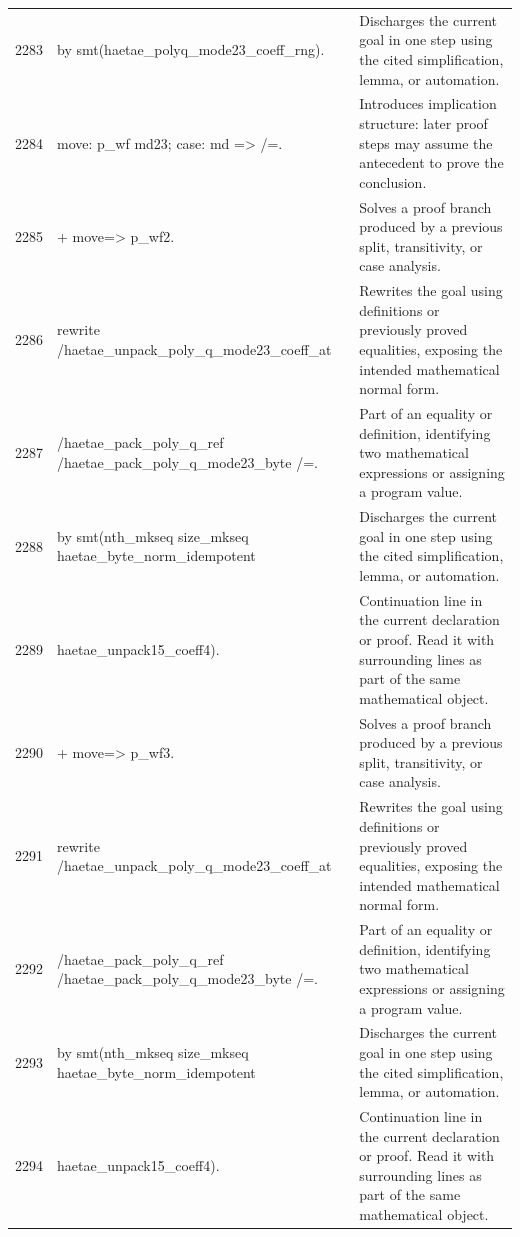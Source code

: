 \documentclass[10pt]{article}
\begin{document}
\begin{longtable}{r L{0.53\textwidth} L{0.37\textwidth}}
2283 & {\ttfamily\scriptsize   by smt(haetae\_polyq\_mode23\_coeff\_rng).} & Discharges the current goal in one step using the cited simplification, lemma, or automation. \\
2284 & {\ttfamily\scriptsize move: p\_wf md23; case: md => /=.} & Introduces implication structure: later proof steps may assume the antecedent to prove the conclusion. \\
2285 & {\ttfamily\scriptsize + move=> p\_wf2.} & Solves a proof branch produced by a previous split, transitivity, or case analysis. \\
2286 & {\ttfamily\scriptsize   rewrite /haetae\_unpack\_poly\_q\_mode23\_coeff\_at} & Rewrites the goal using definitions or previously proved equalities, exposing the intended mathematical normal form. \\
2287 & {\ttfamily\scriptsize           /haetae\_pack\_poly\_q\_ref /haetae\_pack\_poly\_q\_mode23\_byte /=.} & Part of an equality or definition, identifying two mathematical expressions or assigning a program value. \\
2288 & {\ttfamily\scriptsize   by smt(nth\_mkseq size\_mkseq haetae\_byte\_norm\_idempotent} & Discharges the current goal in one step using the cited simplification, lemma, or automation. \\
2289 & {\ttfamily\scriptsize          haetae\_unpack15\_coeff4).} & Continuation line in the current declaration or proof.  Read it with surrounding lines as part of the same mathematical object. \\
2290 & {\ttfamily\scriptsize + move=> p\_wf3.} & Solves a proof branch produced by a previous split, transitivity, or case analysis. \\
2291 & {\ttfamily\scriptsize   rewrite /haetae\_unpack\_poly\_q\_mode23\_coeff\_at} & Rewrites the goal using definitions or previously proved equalities, exposing the intended mathematical normal form. \\
2292 & {\ttfamily\scriptsize           /haetae\_pack\_poly\_q\_ref /haetae\_pack\_poly\_q\_mode23\_byte /=.} & Part of an equality or definition, identifying two mathematical expressions or assigning a program value. \\
2293 & {\ttfamily\scriptsize   by smt(nth\_mkseq size\_mkseq haetae\_byte\_norm\_idempotent} & Discharges the current goal in one step using the cited simplification, lemma, or automation. \\
2294 & {\ttfamily\scriptsize          haetae\_unpack15\_coeff4).} & Continuation line in the current declaration or proof.  Read it with surrounding lines as part of the same mathematical object. \\

\end{longtable}
\end{document}
